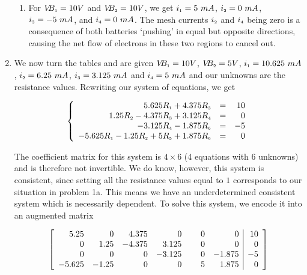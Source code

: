\begin{ex}
\begin{enumerate}
\begin{enumerate}
\item  For $V\!\!B_{\mbox{\tiny$1$}} = 10 V$ and $V\!\!B_{\mbox{\tiny$2$}} = 10 V$, we get $i_{\mbox{\tiny$1$}} = 5 \, \, mA$, $i_{\mbox{\tiny$2$}} = 0 \, \, mA$, $i_{\mbox{\tiny$3$}} = -5 \, \, mA$, and $i_{\mbox{\tiny$4$}} = 0 \, \, mA$.  The mesh currents $i_{\mbox{\tiny$2$}}$ and $i_{\mbox{\tiny$4$}}$ being zero is a consequence of both batteries `pushing' in equal but opposite directions, causing the net flow of electrons in these two regions to cancel out.

\end{enumerate} 

\item  We now turn the tables and are given $V\!\!B_{\mbox{\tiny$1$}} = 10 V$,  $V\!\!B_{\mbox{\tiny$2$}} = 5 V$, $i_{\mbox{\tiny$1$}} = 10.625 \, \, mA$, $i_{\mbox{\tiny$2$}} = 6.25 \, \, mA$, $i_{\mbox{\tiny$3$}} = 3.125 \, \, mA$ and $i_{\mbox{\tiny$4$}} = 5 \, \, mA$ and our unknowns are the resistance values.  Rewriting our system of equations, we get

\[ \left\{ \begin{array}{rcr} 5.625R_{\mbox{\tiny$1$}} + 4.375R_{\mbox{\tiny$3$}}& = & 10 \\
1.25R_{\mbox{\tiny$2$}} - 4.375R_{\mbox{\tiny$3$}} + 3.125R_{\mbox{\tiny$4$}}& = & 0 \\
-3.125R_{\mbox{\tiny$4$}} - 1.875R_{\mbox{\tiny$6$}} & = & -5 \\
-5.625R_{\mbox{\tiny$1$}} - 1.25R_{\mbox{\tiny$2$}} + 5R_{\mbox{\tiny$5$}} + 1.875R_{\mbox{\tiny$6$}} & = & 0 \\  \end{array} \right.\]

The coefficient matrix for this system is $4 \times 6$ (4 equations with 6 unknowns) and is therefore not invertible.  We do know, however, this system is consistent, since setting all the resistance values equal to $1$ corresponds to our situation in problem 1a.  This means we have an underdetermined consistent system which is necessarily dependent.  To solve this system, we encode it into an augmented matrix

\[ \left[ \begin{array}{rrrrrr|r} 
5.25 & 0 & 4.375 & 0 & \hphantom{1.2}0 & 0 & 10 \\ 
0 & 1.25 & -4.375 & 3.125 & 0 & 0 & 0 \\ 
0 & 0 & 0 & -3.125 & 0 & -1.875 & -5 \\
 -5.625 & -1.25 & 0 & 0 & 5 & 1.875 & 0 \\ 
 \end{array} \right] \]


\end{enumerate}
\end{ex}
